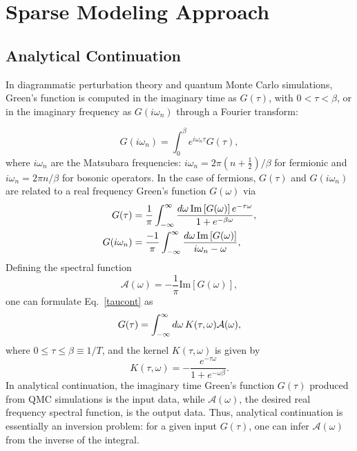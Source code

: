 \documentclass[final,5p,twocolumn,12pt]{elsarticle}
\begin{document}
\section{Sparse Modeling Approach}
\subsection{Analytical Continuation}
In diagrammatic perturbation theory and quantum Monte Carlo simulations, Green's function is computed in the imaginary time as $G(\tau)$, with $0<\tau<\beta$, or in the imaginary frequency as $G(i\omega_n)$ through a Fourier transform:

\begin{equation}
G(i\omega_n)=\int_0^\beta e^{i\omega_n\tau}G(\tau),
\end{equation}
where $i\omega_n$ are the Matsubara frequencies: $i\omega_n = 2\pi(n+\frac{1}{2})/\beta$ for fermionic and $i\omega_n=2\pi n/\beta$ for bosonic operators. In the case of fermions, $G(\tau)$ and $G(i\omega_n)$ are related to a real frequency Green's function $G(\omega)$ via
\begin{align}
G(\tau) &= \frac{1}{\pi}\int_{-\infty}^{\infty}  \frac{d\omega \thinspace \text{Im}\left[G(\omega)\right]e^{-\tau\omega}}{1+e^{-\beta\omega}}, \label{taucont}\\
G(i\omega_n) &= \frac{-1}{\pi}\int_{-\infty}^{\infty}  \frac{d\omega \thinspace \text{Im}\left[G(\omega)\right]}{i\omega_n - \omega},\label{omegacont}
\end{align}
Defining the spectral function
\begin{equation}
\mathcal{A}(\omega)=-\dfrac{1}{\pi}\mbox{Im}\left[G(\omega)\right], 
\end{equation}
one can formulate Eq.~\ref{taucont} as
\begin{equation}
G(\tau)=\int_{-\infty}^{\infty} d\omega\thinspace K(\tau,\omega)\mathcal{A}(\omega),
\label{eq:G=KA}
\end{equation}
where $0\leq\tau\leq\beta\equiv1/T$, and the kernel $K(\tau,\omega)$ is given by 
\begin{equation}
K(\tau,\omega) =-\dfrac{e^{-\tau\omega}}{1+e^{-\omega\beta}}.
\end{equation}
In analytical continuation, the imaginary time Green's function $G(\tau)$ produced from QMC simulations is the input data, while $\mathcal{A}(\omega)$, the desired real frequency spectral function, is the output data. Thus, analytical continuation is essentially an inversion problem: for a given input $G(\tau)$, one can infer $\mathcal{A}(\omega)$ from the inverse of the integral. 
\end{document}
